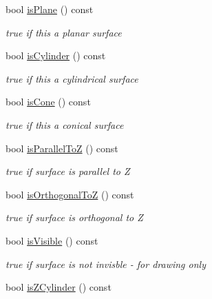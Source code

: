 \begin{DoxyCompactItemize}
bool \hyperlink{class_d_d_surfaces_1_1_surface_type_a6ac9158e037fe074f564bfc34d9f8f6d}{isPlane} () const 
\begin{DoxyCompactList}\small\item\em true if this a planar surface \item\end{DoxyCompactList}\item 
bool \hyperlink{class_d_d_surfaces_1_1_surface_type_a590a029489e8d61324c633072b883609}{isCylinder} () const 
\begin{DoxyCompactList}\small\item\em true if this a cylindrical surface \item\end{DoxyCompactList}\item 
bool \hyperlink{class_d_d_surfaces_1_1_surface_type_ad19fbd07dae4be06196ed3eea391b7b5}{isCone} () const 
\begin{DoxyCompactList}\small\item\em true if this a conical surface \item\end{DoxyCompactList}\item 
bool \hyperlink{class_d_d_surfaces_1_1_surface_type_a87e9f2fdb6fa369cd54178d5e40e5f14}{isParallelToZ} () const 
\begin{DoxyCompactList}\small\item\em true if surface is parallel to Z \item\end{DoxyCompactList}\item 
bool \hyperlink{class_d_d_surfaces_1_1_surface_type_ad1281857fc34ed032d61b5aa975afa56}{isOrthogonalToZ} () const 
\begin{DoxyCompactList}\small\item\em true if surface is orthogonal to Z \item\end{DoxyCompactList}\item 
bool \hyperlink{class_d_d_surfaces_1_1_surface_type_aa20ae135ab952b6501e9d93aacc5125d}{isVisible} () const 
\begin{DoxyCompactList}\small\item\em true if surface is not invisble -\/ for drawing only \item\end{DoxyCompactList}\item 
bool \hyperlink{class_d_d_surfaces_1_1_surface_type_af2fb8402767dd7fe34d9cd9779f02fdb}{isZCylinder} () const 

\end{DoxyCompactItemize}
